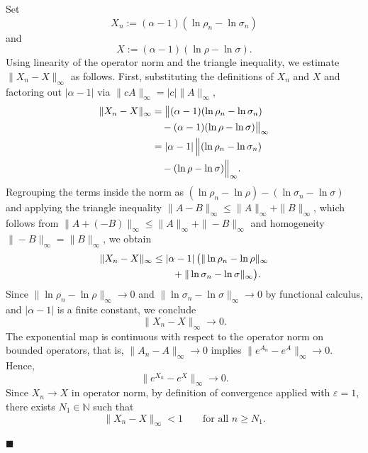 \documentclass[a4paper, amsfonts, amssymb, amsmath, reprint, showkeys, nofootinbib, twoside, aps, pra]{revtex4-2}
\theoremstyle{definition}
\renewenvironment{proof}{\noindent{\bfseries Proof.}}{\hfill$\blacksquare$}
\begin{document}
\begin{proof}
Set
\begin{equation}
    X_n := (\alpha-1)(\ln\rho_n-\ln\sigma_n)
\end{equation}
and 
\begin{equation}
    X := (\alpha-1)(\ln\rho-\ln\sigma).
\end{equation}
Using linearity of the operator norm and the triangle inequality, we estimate 
$\|X_n - X\|_\infty$ as follows. First, substituting the definitions of $X_n$ and 
$X$ and factoring out $|\alpha-1|$ via $\|cA\|_\infty = |c|\|A\|_\infty$,
\begin{align}
    \|X_n-X\|_{\infty} 
    &= \bigl\|(\alpha-1)(\ln\rho_n-\ln\sigma_n) \nonumber \\
    &\quad - (\alpha-1)(\ln\rho-\ln\sigma)\bigr\|_{\infty} \nonumber \\
    &= |\alpha-1|\,\Bigl\|(\ln\rho_n - \ln\sigma_n) \nonumber \\
    &\quad - (\ln\rho - \ln\sigma)\Bigr\|_{\infty}.
\end{align}
Regrouping the terms inside the norm as 
$(\ln\rho_n - \ln\rho) - (\ln\sigma_n - \ln\sigma)$
and applying the triangle inequality $\|A - B\|_\infty \le \|A\|_\infty + \|B\|_\infty$,
which follows from $\|A+(-B)\|_\infty \le \|A\|_\infty + \|-B\|_\infty$ and 
homogeneity $\|-B\|_\infty = \|B\|_\infty$, we obtain
\begin{align}
    \|X_n-X\|_{\infty} 
    &\le |\alpha-1|\,\bigl(\|\ln\rho_n - \ln\rho\|_{\infty} \notag\\
    &\qquad + \|\ln\sigma_n - \ln\sigma\|_{\infty}\bigr).
\end{align}
Since $\|\ln\rho_n - \ln\rho\|_\infty \to 0$ and $\|\ln\sigma_n - \ln\sigma\|_\infty \to 0$ 
by functional calculus, and $|\alpha-1|$ is a finite constant, we conclude
\begin{equation}
    \|X_n - X\|_\infty \to 0.
\end{equation}
The exponential map is continuous with respect to the operator norm on bounded 
operators, that is, $\|A_n - A\|_\infty \to 0$ implies 
$\|e^{A_n} - e^{A}\|_\infty \to 0$. Hence,
\begin{equation}
    \|e^{X_n}-e^{X}\|_{\infty}\to 0.
\end{equation}
Since $X_n\to X$ in operator norm, by definition of convergence 
applied with $\varepsilon = 1$, there exists $N_1\in\mathbb{N}$ such that
\begin{equation}
    \|X_n - X\|_{\infty} < 1 \qquad \text{for all } n \ge N_1.
\end{equation}

\end{proof}
\end{document}
